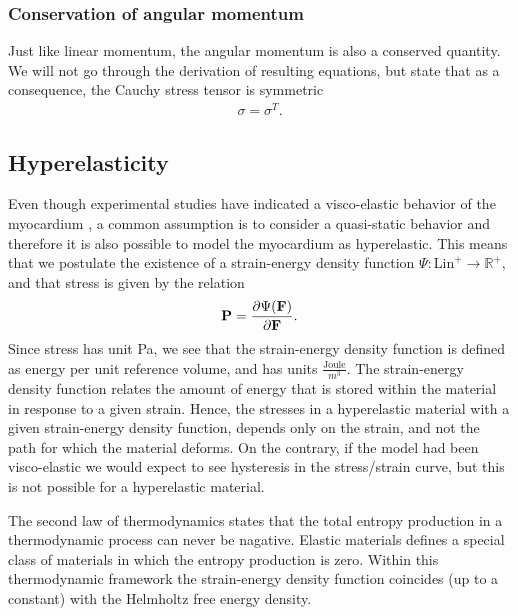 \subsubsection{Conservation of angular momentum}
Just like linear momentum, the angular momentum is also a conserved
quantity. We will not go through the derivation of resulting
equations, but state that as a consequence, the Cauchy stress tensor is
symmetric
\begin{align}
  \sigma = \sigma^T.
\end{align}



\subsection{Hyperelasticity}
\label{sec:hyperelasticity}

Even though experimental studies have indicated a visco-elastic behavior
of the myocardium \cite{dokos2002shear, gultekin2016orthotropic}, a
common assumption is to consider a quasi-static behavior and therefore
it is also possible to model the myocardium as hyperelastic.
This means that we postulate the existence of
a strain-energy density function $\Psi:\mathrm{Lin}^+ \rightarrow
\mathbb{R}^+$, and that stress is given by the relation
\begin{align}
\mathbf{P} = \frac{\partial \Psi(\mathbf{F})}{\partial \mathbf{F}}.
\end{align}
Since stress has unit Pa, we see that the strain-energy density
function is defined as energy per unit reference volume, and has units
$\frac{\text{Joule}}{m^3}$. 
The strain-energy density function relates  the amount of
energy that is stored within the material in response to a given
strain. Hence, the stresses in a hyperelastic material with a given
strain-energy density function, depends only on the strain, and not the
path for which the material deforms. On the contrary, if the model had
been visco-elastic we would expect to see hysteresis in the
stress/strain curve, but this is not possible for a hyperelastic
material. 

\begin{remark}
  The second law of thermodynamics states that the total entropy
  production in a thermodynamic process can never be nagative. Elastic
  materials defines a special class of materials in which the entropy
  production is zero. Within this thermodynamic framework the
  strain-energy density function coincides (up to a constant) with the
  Helmholtz free energy density.
\end{remark}


